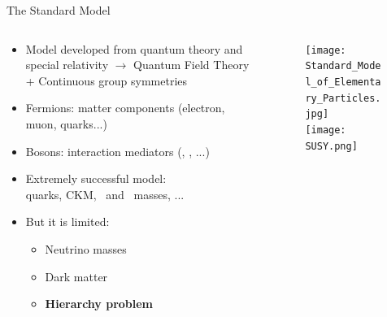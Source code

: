 \begin{frame}{The Standard Model}
\vspace{-.2cm}
\begin{columns}

\begin{column}{.50\textwidth}
\begin{block}{}
\begin{itemize}\scriptsize
\item Model developed from quantum theory and special relativity $\to$ Quantum Field Theory + Continuous group symmetries
\item Fermions: matter components (electron, muon, quarks...)
\item Bosons: interaction mediators (\W, \Z, ...)
\item Extremely successful model: \\ quarks, CKM, \W~and \Z~masses, ...
\item But it is limited:
  \begin{itemize}\scriptsize
  \item Neutrino masses
  \item Dark matter
  \item \textbf{Hierarchy problem}
  \end{itemize}
\end{itemize}
\end{block}
\end{column}

\begin{column}{.50\textwidth}
\begin{figure}[!Hhtbp]
  \begin{center}
    \texttt{[image: Standard\_Model\_of\_Elementary\_Particles.jpg]}\\
    \vspace{.6cm}
    \texttt{[image: SUSY.png]}
  \end{center}
\end{figure}
\end{column}
\end{columns}
\end{frame}


